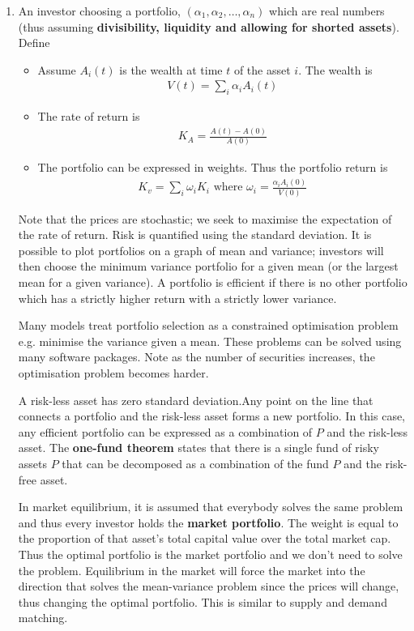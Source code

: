 \documentclass[a4paper]{article}
\newcommand{\ix}[1]{%
  \leavevmode %
  \marginpar{\small\emph{#1}}%
}
\begin{document}
\begin{enumerate}
\item\ix{Portfolio Management}An investor choosing a portfolio, $(\alpha_1, \alpha_2, \ldots, \alpha_n)$ which are real numbers (thus assuming \textbf{divisibility, liquidity and allowing for shorted assets}). Define
\begin{itemize}
	\item Assume $A_i(t)$ is the wealth at time $t$ of the asset $i$.  The wealth is
	\begin{align*}
	V(t) = \sum_i \alpha_i A_i(t)
	\end{align*}
	\item The rate of return is
	\begin{align*}
	K_A = \frac{A(t)-A(0)}{A(0)}
	\end{align*}
	\item The portfolio can be expressed in weights. Thus the portfolio return is 
	\begin{align*}
	K_v = \sum_i \omega_i K_i \text{ where } \omega_i = \frac{\alpha_i A_i(0)}{V(0)}
	\end{align*}
\end{itemize}
	Note that the prices are stochastic; we seek to maximise the expectation of the rate of return. Risk is quantified using the standard deviation. It is possible to plot portfolios on a graph of mean and variance; investors will then choose the minimum variance portfolio for a given mean (or the largest mean for a given variance). A portfolio is efficient if there is no other portfolio which has a strictly higher return with a strictly lower variance. 

Many models treat portfolio selection as a constrained optimisation problem e.g. minimise the variance given a mean. These problems can be solved using many software packages. Note as the number of securities increases, the optimisation problem becomes harder. 

A risk-less asset has zero standard deviation.Any point on the line that connects a portfolio and the risk-less asset forms a new portfolio. In this case, any efficient portfolio can be expressed as a combination of $P$ and the risk-less asset. The \textbf{one-fund theorem} states that there is a single fund of risky assets $P$ that can be decomposed as a combination of the fund $P$ and the risk-free asset.  

In market equilibrium, it is assumed that everybody solves the same problem and thus every investor holds the \textbf{market portfolio}. The weight is equal to the proportion of that asset's total capital value over the total market cap. Thus the optimal portfolio is the market portfolio and we don't need to solve the problem. Equilibrium in the market will force the market into the direction that solves the mean-variance problem since the prices will change, thus changing the optimal portfolio. This is similar to supply and demand matching. 


\end{enumerate}
\end{document}
